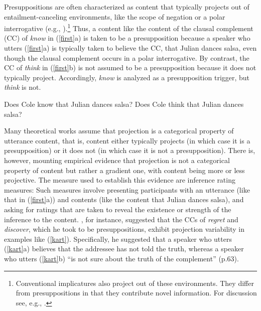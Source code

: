 \documentclass[11pt,fleqn]{article}
\newcommand{\6}{\mbox{$[\hspace*{-.6mm}[$}}
\newcommand{\9}{\mbox{$]\hspace*{-.6mm}]$}}
\begin{document}
Presuppositions are often characterized as content that typically projects out of entailment-canceling environments, like the scope of negation or a polar interrogative (e.g., \citealt{ccmg90}).\footnote{Conventional implicatures also project out of these environments. They differ from presuppositions in that they contribute novel information. For discussion see, e.g., \citealt{ccmg90,potts05}.} Thus, a content like the content of the clausal complement (CC) of {\em know} in (\ref{first}a) is taken to be a presupposition because a speaker who utters (\ref{first}a) is typically taken to believe the CC, that Julian dances salsa, even though the clausal complement occurs in a polar interrogative. By contrast, the CC of {\em think} in (\ref{first}b) is not assumed to be a presupposition because it does not typically project. Accordingly, {\em know} is analyzed as a presupposition trigger, but {\em think} is not.

\begin{exe}
\ex\label{first} 
\begin{xlist}
\ex Does Cole know that Julian dances salsa?
\ex Does Cole think that Julian dances salsa?
\end{xlist}
\end{exe}

Many theoretical works assume that projection is a categorical property of utterance content, that is, content either typically projects (in which case it is a presupposition) or it does not (in which case it is not a presupposition). There is, however, mounting empirical evidence that projection is not a categorical property of  content but rather a gradient one, with content being more or less projective. The measure used to establish this evidence are inference rating measures: Such measures involve presenting participants with an utterance (like that in (\ref{first}a)) and contents (like the content that Julian dances salsa), and asking for ratings that are taken to reveal the existence or strength of the inference to the content. \citealt{karttunen71b}, for instance, suggested that the CCs of {\em regret} and {\em discover}, which he took to be presuppositions, exhibit projection variability in examples like (\ref{kart}). Specifically, he suggested that a speaker who utters (\ref{kart}a) believes that the addressee has not told the truth, whereas a speaker who utters (\ref{kart}b) ``is not sure about the truth of the complement'' (p.63).
\end{document}
